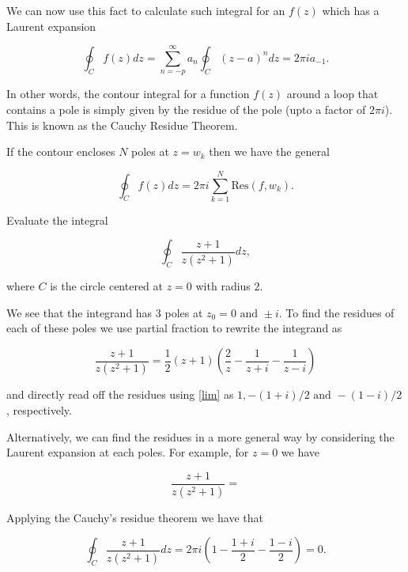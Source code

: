 \documentclass[english,a4paper,12pt]{report}
\begin{document}
We can now use this fact to calculate such integral for an \(f(z)\) which has a Laurent expansion

\begin{equation}
    \oint_{C} f(z)dz = \sum_{n=-p}^{\infty} a_{n} \oint_{C} (z-a)^{n} dz = 2\pi i a_{-1}.
\end{equation}

In other words, the contour integral for a function \(f(z)\) around a loop that contains a pole is simply given by the residue of the pole (upto a factor of \(2\pi i\)). This is known as the Cauchy Residue Theorem.

If the contour encloses \(N\) poles at \(z = w_{k} \) then we have the general

\begin{equation}
    \oint_{C} f(z)dz = 2\pi i \sum_{k=1}^{N} \text{Res}(f,w_{k} ). 
\end{equation}

{Evaluate the integral 

\begin{equation}
    \oint_{C} \frac{z+1}{z(z^2+1)}dz,
\end{equation}

where \(C\) is the circle centered at \(z = 0\) with radius \(2\). 
}
{We see that the integrand has 3 poles at \(z_0 =0 \text { and } \pm i\). To find the residues of each of these poles we use partial fraction to rewrite the integrand as 

\begin{equation}
    \frac{z+1}{z(z^2+1)} = \frac{1}{2} (z+1)\left( \frac{2}{z} - \frac{1}{z+i} - \frac{1}{z-i}    \right)
\end{equation}

and directly read off the residues using \cref{lim} as \(1,-(1+i)/2 \text { and } -(1-i) /2\), respectively.

Alternatively, we can find the residues in a more general way by considering the Laurent expansion at each poles. For example, for \(z= 0\) we have 

\begin{equation}
    \frac{z+1}{z(z^2+1)} =  
\end{equation}


Applying the Cauchy's residue theorem we have that 

\begin{equation}
    \oint_{C} \frac{z+1}{z(z^2+1)}dz = 2\pi i\left( 1 - \frac{1+i}{2} - \frac{1-i}{2}   \right) = 0.
\end{equation}
~
}
\end{document}
